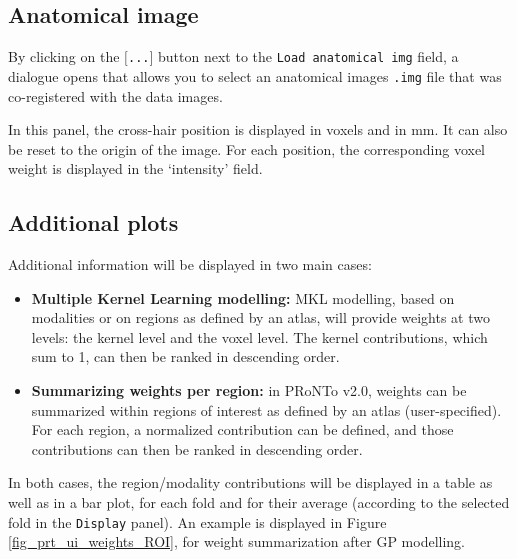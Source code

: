 \subsection{Anatomical image}

By clicking on the $[${\tt ...}$]$ button next to the {\tt Load anatomical img} field, 
a dialogue opens that allows you to select an anatomical images {\tt .img} file that was co-registered with the data images.

In this panel, the cross-hair position is displayed in voxels and in mm. It can also be reset to the origin of the image. For each position, the corresponding voxel weight is displayed in the `intensity' field.

\subsection{Additional plots}

Additional information will be displayed in two main cases:
\begin{itemize}
\item \textbf{Multiple Kernel Learning modelling:} MKL modelling, based on modalities or on regions as defined by an atlas, will provide weights at two levels: the kernel level and the voxel level. The kernel contributions, which sum to 1, can then be ranked in descending order. 
\item \textbf{Summarizing weights per region:} in PRoNTo v2.0, weights can be summarized within regions of interest as defined by an atlas (user-specified). For each region, a normalized contribution can be defined, and those contributions can then be ranked in descending order. 
\end{itemize}

In both cases, the region/modality contributions will be displayed in a table as well as in a bar plot, for each fold and for their average (according to the selected fold in the \texttt{Display} panel). An example is displayed in Figure \ref{fig_prt_ui_weights_ROI}, for weight summarization after GP modelling.

